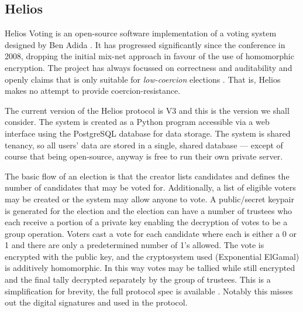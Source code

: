 \subsection{Helios}

Helios Voting is an open-source software implementation of a voting system designed by Ben Adida \cite{adidaHeliosWebBasedOpenAudit2008}. It has progressed significantly since the conference in 2008, dropping the initial mix-net approach in favour of the use of homomorphic encryption. The project has always focussed on correctness and auditability and openly claims that is only suitable for \emph{low-coercion} elections \cite{HeliosVotingFAQ}. That is, Helios makes no attempt to provide coercion-resistance.

The current version of the Helios protocol is V3 and this is the version we shall consider. The system is created as a Python program accessible via a web interface using the PostgreSQL database for data storage. The system is shared tenancy, so all users' data are stored in a single, shared database --- except of course that being open-source, anyway is free to run their own private server.

The basic flow of an election is that the creator lists candidates and defines the number of candidates that may be voted for. Additionally, a list of eligible voters may be created or the system may allow anyone to vote. A public/secret keypair is generated for the election and the election can have a number of trustees who each receive a portion of a private key enabling the decryption of votes to be a group operation. Voters cast a vote for each candidate where each is either a 0 or 1 and there are only a predetermined number of 1's allowed. The vote is encrypted with the public key, and the cryptosystem used (Exponential ElGamal) is additively homomorphic. In this way votes may be tallied while still encrypted and the final tally decrypted separately by the group of trustees. This is a simplification for brevity, the full protocol spec is available \cite{HeliosHeliosV3}. Notably this misses out the digital signatures and  used in the protocol.

